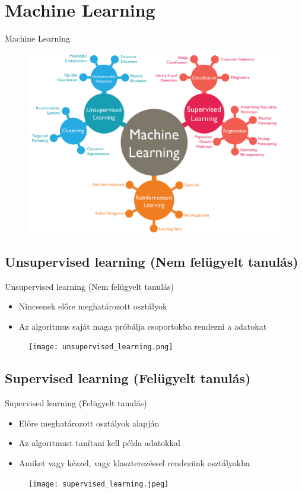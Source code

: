 \documentclass{beamer}
\begin{document}
\section{Machine Learning}
\begin{frame}{Machine Learning}
    \centering
    \begin{figure}
        \includegraphics[scale=0.2]{machine_learning.png}    
    \end{figure}
\end{frame}
\subsection{Unsupervised learning (Nem felügyelt tanulás)}
\begin{frame}{Unsupervised learning (Nem felügyelt tanulás)}
    \begin{itemize}
        \item Nincsenek előre meghatározott osztályok
        \item Az algoritmus saját maga próbálja csoportokba rendezni a adatokat
    \end{itemize}
    \begin{figure}
        \texttt{[image: unsupervised\_learning.png]}
    \end{figure}
\end{frame}
\subsection{Supervised learning (Felügyelt tanulás)}
\begin{frame}{Supervised learning (Felügyelt tanulás)}
    \begin{itemize}
        \item Előre meghatározott osztályok alapján
        \item Az algoritmust tanítani kell példa adatokkal 
        \item Amiket vagy kézzel, vagy klaszterezéssel rendezünk osztályokba
    \end{itemize}
    \begin{figure}
        \texttt{[image: supervised\_learning.jpeg]}
    \end{figure}
\end{frame}
\end{document}
